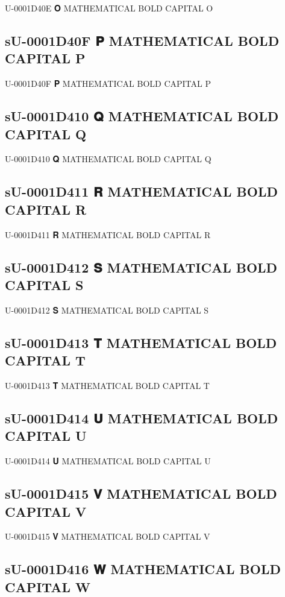 U-0001D40E 𝐎 MATHEMATICAL BOLD CAPITAL O

\subsection{sU-0001D40F 𝐏 MATHEMATICAL BOLD CAPITAL P}

U-0001D40F 𝐏 MATHEMATICAL BOLD CAPITAL P

\subsection{sU-0001D410 𝐐 MATHEMATICAL BOLD CAPITAL Q}

U-0001D410 𝐐 MATHEMATICAL BOLD CAPITAL Q

\subsection{sU-0001D411 𝐑 MATHEMATICAL BOLD CAPITAL R}

U-0001D411 𝐑 MATHEMATICAL BOLD CAPITAL R

\subsection{sU-0001D412 𝐒 MATHEMATICAL BOLD CAPITAL S}

U-0001D412 𝐒 MATHEMATICAL BOLD CAPITAL S

\subsection{sU-0001D413 𝐓 MATHEMATICAL BOLD CAPITAL T}

U-0001D413 𝐓 MATHEMATICAL BOLD CAPITAL T

\subsection{sU-0001D414 𝐔 MATHEMATICAL BOLD CAPITAL U}

U-0001D414 𝐔 MATHEMATICAL BOLD CAPITAL U

\subsection{sU-0001D415 𝐕 MATHEMATICAL BOLD CAPITAL V}

U-0001D415 𝐕 MATHEMATICAL BOLD CAPITAL V

\subsection{sU-0001D416 𝐖 MATHEMATICAL BOLD CAPITAL W}

